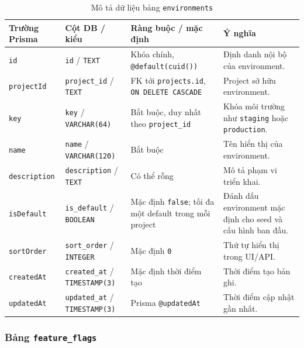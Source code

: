 \begin{table}[H]
    \centering
    \caption{Mô tả dữ liệu bảng \texttt{environments}}
    \label{tab:db-environments}
    \begingroup
    \singlespacing
    \scriptsize
    \setlength{\tabcolsep}{3pt}
    \renewcommand{\arraystretch}{1.12}
    \begin{tabular}{p{} p{} p{} p{}}
        \toprule
        \textbf{Trường Prisma} & \textbf{Cột DB / kiểu} & \textbf{Ràng buộc / mặc định} & \textbf{Ý nghĩa} \\
        \midrule
        \texttt{id} & \texttt{id} / \texttt{TEXT} & Khóa chính, \texttt{@default(cuid())} & Định danh nội bộ của environment. \\
        \texttt{projectId} & \texttt{project\_id} / \texttt{TEXT} & FK tới \texttt{projects.id}, \texttt{ON DELETE CASCADE} & Project sở hữu environment. \\
        \texttt{key} & \texttt{key} / \texttt{VARCHAR(64)} & Bắt buộc, duy nhất theo \texttt{project\_id} & Khóa môi trường như \texttt{staging} hoặc \texttt{production}. \\
        \texttt{name} & \texttt{name} / \texttt{VARCHAR(120)} & Bắt buộc & Tên hiển thị của environment. \\
        \texttt{description} & \texttt{description} / \texttt{TEXT} & Có thể rỗng & Mô tả phạm vi triển khai. \\
        \texttt{isDefault} & \texttt{is\_default} / \texttt{BOOLEAN} & Mặc định \texttt{false}; tối đa một default trong mỗi project & Đánh dấu environment mặc định cho seed và cấu hình ban đầu. \\
        \texttt{sortOrder} & \texttt{sort\_order} / \texttt{INTEGER} & Mặc định \texttt{0} & Thứ tự hiển thị trong UI/API. \\
        \texttt{createdAt} & \texttt{created\_at} / \texttt{TIMESTAMP(3)} & Mặc định thời điểm tạo & Thời điểm tạo bản ghi. \\
        \texttt{updatedAt} & \texttt{updated\_at} / \texttt{TIMESTAMP(3)} & Prisma \texttt{@updatedAt} & Thời điểm cập nhật gần nhất. \\
        \bottomrule
    \end{tabular}
    \endgroup
\end{table}

\subsubsection{Bảng \texttt{feature\_flags}}

